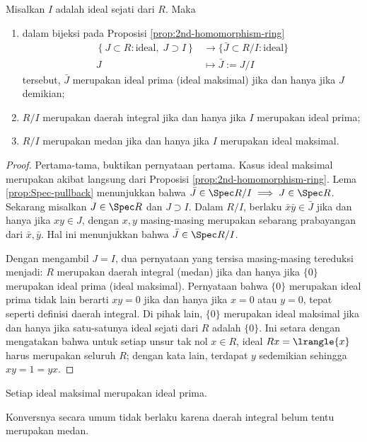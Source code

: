 \begin{proposition}\label{prop:prime-maximal-ideals}
	Misalkan $I$ adalah ideal sejati dari $R$. Maka
	\begin{enumerate}
		\item dalam bijeksi pada Proposisi \ref{prop:2nd-homomorphism-ring}
		\begin{align*}
			\left\{ J \subset R: \text{ideal}, \; J \supset I \right\} & \longrightarrow \{ \bar{J} \subset R/I : \text{ideal} \} \\
			J & \longmapsto \bar{J} := J/I
		\end{align*}
		tersebut, $\bar{J}$ merupakan ideal prima (ideal maksimal) jika dan hanya jika $J$ demikian;
		\item $R/I$ merupakan daerah integral jika dan hanya jika $I$ merupakan ideal prima;
		\item $R/I$ merupakan medan jika dan hanya jika $I$ merupakan ideal maksimal.
	\end{enumerate}
\end{proposition}
\begin{proof}
	Pertama-tama, buktikan pernyataan pertama. Kasus ideal maksimal merupakan akibat langsung dari Proposisi \ref{prop:2nd-homomorphism-ring}. Lema \ref{prop:Spec-pullback} menunjukkan bahwa $\bar{J} \in \Spec R/I \implies J \in \Spec R$. Sekarang misalkan $J \in \Spec R$ dan $J \supset I$. Dalam $R/I$, berlaku $\bar{x}\bar{y} \in \bar{J}$ jika dan hanya jika $xy \in J$, dengan $x,y$ masing-masing merupakan sebarang prabayangan dari $\bar{x}, \bar{y}$. Hal ini menunjukkan bahwa $\bar{J} \in \Spec R/I$.

	Dengan mengambil $J=I$, dua pernyataan yang tersisa masing-masing tereduksi menjadi: $R$ merupakan daerah integral (medan) jika dan hanya jika $\{0\}$ merupakan ideal prima (ideal maksimal). Pernyataan bahwa $\{0\}$ merupakan ideal prima tidak lain berarti $xy=0$ jika dan hanya jika $x=0$ atau $y=0$, tepat seperti definisi daerah integral. Di pihak lain, $\{0\}$ merupakan ideal maksimal jika dan hanya jika satu-satunya ideal sejati dari $R$ adalah $\{0\}$. Ini setara dengan mengatakan bahwa untuk setiap unsur tak nol $x \in R$, ideal $Rx = \lrangle{x}$ harus merupakan seluruh $R$; dengan kata lain, terdapat $y$ sedemikian sehingga $xy=1=yx$.
\end{proof}

\begin{corollary}\label{prop:maximal-implies-prime}
	Setiap ideal maksimal merupakan ideal prima.
\end{corollary}
Konversnya secara umum tidak berlaku karena daerah integral belum tentu merupakan medan.

